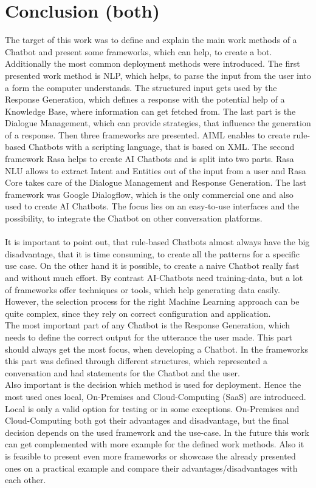 \documentclass[10pt,final,journal,a4paper,oneside,twocolumn]{IEEEtran}
\begin{document}
\section{Conclusion (both)}
The target of this work was to define and explain the main work methods of a Chatbot and present some frameworks, which can help, to create a bot. Additionally the most common deployment methods were introduced. The first presented work method is NLP, which helps, to parse the input from the user into a form the computer understands. The structured input gets used by the Response Generation, which defines a response with the potential help of a Knowledge Base, where information can get fetched from. The last part is the Dialogue Management, which can provide strategies, that influence the generation of a response. Then three frameworks are presented. AIML enables to create rule-based Chatbots with a scripting language, that is based on XML. The second framework Rasa helps to create AI Chatbots and is split into two parts. Rasa NLU allows to extract Intent and Entities out of the input from a user and Rasa Core takes care of the Dialogue Management and Response Generation. The last framework was Google Dialogflow, which is the only commercial one and also used to create AI Chatbots. The focus lies on an easy-to-use interfaces and the possibility, to integrate the Chatbot on other conversation platforms.\\
\\
It is important to point out, that rule-based Chatbots almost always have the big disadvantage, that it is time consuming, to create all the patterns for a specific use case. On the other hand it is possible, to create a naive Chatbot really fast and without much effort. By contrast AI-Chatbots need training-data, but a lot of frameworks offer techniques or tools, which help generating data easily. However, the selection process for the right Machine Learning approach can be quite complex, since they rely on correct configuration and application.\\
The most important part of any Chatbot is the Response Generation, which needs to define the correct output for the utterance the user made. This part should always get the most focus, when developing a Chatbot. In the frameworks this part was defined through different structures, which represented a conversation and had statements for the Chatbot and the user. \\
Also important is the decision which method is used for deployment. Hence the most used ones local, On-Premises and Cloud-Computing (SaaS) are introduced. Local is only a valid option for testing or in some exceptions. On-Premises and Cloud-Computing both got their advantages and disadvantage, but the final decision depends on the used framework and the use-case. 
In the future this work can get complemented with more example for the defined work methods. Also it is feasible to present even more frameworks or showcase the already presented ones on a practical example and compare their advantages/disadvantages with each other.
\end{document}
